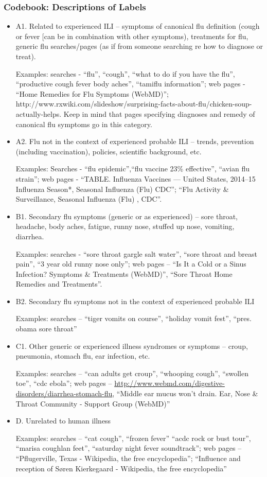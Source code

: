 \documentclass[12pt]{article}
\begin{document}
\subsubsection{Codebook: Descriptions of Labels}
\begin{itemize}
\item A1. Related to experienced ILI – symptoms of canonical flu definition (cough or fever [can be in combination with other symptoms), treatments for flu, generic flu searches/pages (as if from someone searching re how to diagnose or treat).

Examples: searches - “flu”, “cough”, “what to do if you have the flu”, “productive cough fever body aches”, “tamiflu information”; web pages - “Home Remedies for Flu Symptoms (WebMD)”; http://www.rxwiki.com/slideshow/surprising-facts-about-flu/chicken-soup-actually-helps. 
Keep in mind that pages specifying diagnoses and remedy of canonical flu symptoms go in this category.

\item A2. Flu not in the context of experienced probable ILI – trends, prevention (including vaccination), policies, scientific background, etc.

Examples: Searches - ``flu epidemic'',``flu vaccine 23\% effective'', ``avian flu strain''; web pages - ``TABLE. Influenza Vaccines — United States, 2014–15 Influenza Season*,  Seasonal Influenza (Flu)  CDC”; ``Flu Activity \& Surveillance, Seasonal Influenza (Flu) , CDC''.

\item B1. Secondary flu symptoms (generic or as experienced) – sore throat, headache, body aches, fatigue, runny nose, stuffed up nose, vomiting, diarrhea.

Examples: searches - ``sore throat gargle salt water'', ``sore throat and breast pain'', ``3 year old runny nose only''; web pages – ``Is It a Cold or a Sinus Infection? Symptoms \& Treatments (WebMD)'', ``Sore Throat Home Remedies and Treatments''.

\item B2. Secondary flu symptoms not in the context of experienced probable ILI 

Examples: searches – “tiger vomits on course”, “holiday vomit fest”, “pres. obama sore throat”

 \item C1. Other generic or experienced illness syndromes or symptoms – croup, pneumonia, stomach flu, ear infection, etc.

Examples: searches – ``can adults get croup'', ``whooping cough'', ``swollen toe'', ``cdc ebola''; web pages – \url{http://www.webmd.com/digestive-disorders/diarrhea-stomach-flu}, ``Middle ear mucus won't drain. Ear, Nose \& Throat Community - Support Group (WebMD)''

\item D. Unrelated to human illness 

Examples: searches – “cat cough”, “frozen fever” “acdc rock or bust tour”, “marisa coughlan feet”, “saturday night fever soundtrack”; web pages – “Pflugerville, Texas - Wikipedia, the free encyclopedia”; “Influence and reception of Søren Kierkegaard - Wikipedia, the free encyclopedia”
\end{itemize}
\end{document}
